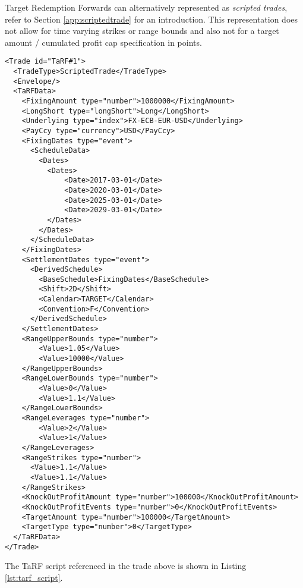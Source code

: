 
Target Redemption Forwards can alternatively represented as {\em scripted trades}, refer to Section
\ref{app:scriptedtrade} for an introduction. This representation does not allow for time varying strikes or range
bounds and also not for a target amount / cumulated profit cap specification in points.

\begin{verbatim}
<Trade id="TaRF#1">
  <TradeType>ScriptedTrade</TradeType>
  <Envelope/>
  <TaRFData>
    <FixingAmount type="number">1000000</FixingAmount>
    <LongShort type="longShort">Long</LongShort>
    <Underlying type="index">FX-ECB-EUR-USD</Underlying>
    <PayCcy type="currency">USD</PayCcy>
    <FixingDates type="event">
      <ScheduleData>
        <Dates>
          <Dates>
              <Date>2017-03-01</Date>
              <Date>2020-03-01</Date>
              <Date>2025-03-01</Date>
              <Date>2029-03-01</Date>
          </Dates>
        </Dates>
      </ScheduleData>
    </FixingDates>
    <SettlementDates type="event">
      <DerivedSchedule>
        <BaseSchedule>FixingDates</BaseSchedule>
        <Shift>2D</Shift>
        <Calendar>TARGET</Calendar>
        <Convention>F</Convention>
      </DerivedSchedule>
    </SettlementDates>
    <RangeUpperBounds type="number">
        <Value>1.05</Value>
        <Value>10000</Value>
    </RangeUpperBounds>
    <RangeLowerBounds type="number">
        <Value>0</Value>
        <Value>1.1</Value>
    </RangeLowerBounds>
    <RangeLeverages type="number">
        <Value>2</Value>
        <Value>1</Value>
    </RangeLeverages>
    <RangeStrikes type="number">
      <Value>1.1</Value>
      <Value>1.1</Value>
    </RangeStrikes>
    <KnockOutProfitAmount type="number">100000</KnockOutProfitAmount>
    <KnockOutProfitEvents type="number">0</KnockOutProfitEvents>
    <TargetAmount type="number">100000</TargetAmount>
    <TargetType type="number">0</TargetType>
  </TaRFData>
</Trade>
\end{verbatim}

The TaRF script referenced in the trade above is shown in Listing \ref{lst:tarf_script}.

